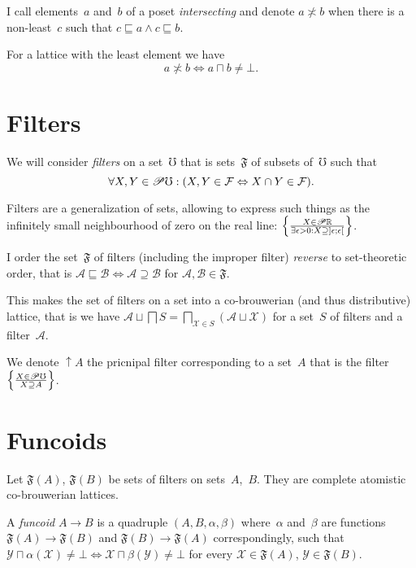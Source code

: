 \documentclass{amsart}
\begin{document}
I call elements~$a$ and~$b$ of a poset \emph{intersecting} and
denote $a\nasymp b$ when there is a non-least~$c$ such that $c\sqsubseteq a\land c\sqsubseteq b$.

For a lattice with the least element we have
\[ a\nasymp b \Leftrightarrow a\sqcap b\ne\bot. \]

\section{Filters}

We will consider \emph{filters} on a set~$\mho$ that is sets~$\mathfrak{F}$ of subsets of~$\mho$ such that
\[ \forall X,Y\in\mathscr{P}\mho:
(X,Y\in\mathcal{F} \Leftrightarrow X\cap Y\in\mathcal{F}). \]

Filters are a generalization of sets, allowing to express such things as the infinitely small neighbourhood of zero on the real line: $\left\{ \frac{X\in\mathscr{P}\mathbb{R}}{\exists\epsilon>0:X\supseteq\left]\epsilon;\epsilon\right[}\right\}$.

\begin{defn}
I order the set~$\mathfrak{F}$ of filters (including the improper filter) \emph{reverse} to set-theoretic order, that is
$\mathcal{A} \sqsubseteq \mathcal{B} \Leftrightarrow \mathcal{A} \supseteq \mathcal{B}$
for $\mathcal{A},\mathcal{B}\in\mathfrak{F}$.
\end{defn}

\begin{prop}
This makes the set of filters on a set into a co-brouwerian (and thus distributive) lattice, that is we have
$\mathcal{A} \sqcup \bigsqcap S = \bigsqcap_{\mathcal{X}\in S} (\mathcal{A} \sqcup \mathcal{X})$
for a set~$S$ of filters and a filter~$\mathcal{A}$.
\end{prop}

We denote $\uparrow A$ the pricnipal filter corresponding to a set~$A$ that is the filter $\left\{ \frac{X\in\mathscr{P}\mho}{X\supseteq A}\right\}$.

\section{Funcoids}

Let $\mathfrak{F}(A)$, $\mathfrak{F}(B)$ be sets of filters on sets~$A$,~$B$.
They are complete atomistic co-brouwerian lattices.

\begin{defn}
A \emph{funcoid} $A\rightarrow B$ is a quadruple $(A,B,\alpha,\beta)$
where~$\alpha$ and~$\beta$ are functions $\mathfrak{F}(A)\rightarrow \mathfrak{F}(B)$
and $\mathfrak{F}(B)\rightarrow \mathfrak{F}(A)$ correspondingly, such that
$\mathcal{Y} \sqcap \alpha(\mathcal{X}) \ne \bot \Leftrightarrow \mathcal{X} \sqcap \beta(\mathcal{Y}) \ne \bot$
for every $\mathcal{X}\in\mathfrak{F}(A)$, $\mathcal{Y}\in\mathfrak{F}(B)$.
\end{defn}
\end{document}

